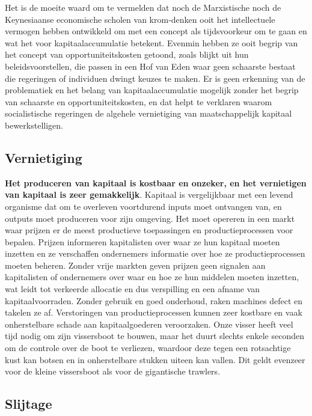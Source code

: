 Het is de moeite waard om te vermelden dat noch de Marxistische noch de Keynesiaanse economische scholen van krom-denken ooit het intellectuele vermogen hebben ontwikkeld om met een concept als tijdsvoorkeur om te gaan en wat het voor kapitaalaccumulatie betekent. Evenmin hebben ze ooit begrip van het concept van opportuniteitskosten getoond, zoals blijkt uit hun beleidsvoorstellen, die passen in een Hof van Eden waar geen schaarste bestaat die regeringen of individuen dwingt keuzes te maken. Er is geen erkenning van de problematiek en het belang van kapitaalaccumulatie mogelijk zonder het begrip van schaarste en opportuniteitskosten, en dat helpt te verklaren waarom socialistische regeringen de algehele vernietiging van maatschappelijk kapitaal bewerkstelligen.

\subsection{Vernietiging}

\textbf{Het produceren van kapitaal is kostbaar en onzeker, en het vernietigen van kapitaal is zeer gemakkelijk}. Kapitaal is vergelijkbaar met een levend organisme dat om te overleven voortdurend inputs moet ontvangen van, en outputs moet produceren voor zijn omgeving. Het moet opereren in een markt waar prijzen er de meest productieve toepassingen en productieprocessen voor bepalen. Prijzen informeren kapitalisten over waar ze hun kapitaal moeten inzetten en ze verschaffen ondernemers informatie over hoe ze productieprocessen moeten beheren. Zonder vrije markten geven prijzen geen signalen aan kapitalisten of ondernemers over waar en hoe ze hun middelen moeten inzetten, wat leidt tot verkeerde allocatie en dus verspilling en een afname van kapitaalvoorraden. Zonder gebruik en goed onderhoud, raken machines defect en takelen ze af. Verstoringen van productieprocessen kunnen zeer kostbare en vaak onherstelbare schade aan kapitaalgoederen veroorzaken. Onze visser heeft veel tijd nodig om zijn vissersboot te bouwen, maar het duurt slechts enkele seconden om de controle over de boot te verliezen, waardoor deze tegen een rotsachtige kust kan botsen en in onherstelbare stukken uiteen kan vallen. Dit geldt evenzeer voor de kleine vissersboot als voor de gigantische trawlers.

\subsection{Slijtage}

